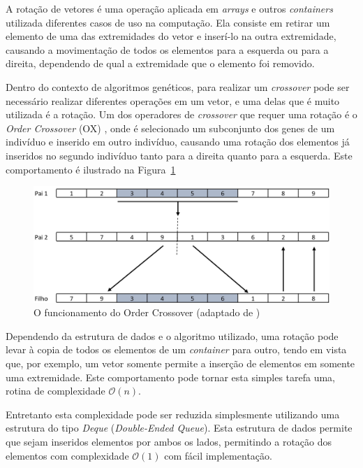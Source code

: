 \documentclass[12pt]{article}
\begin{document}
A rota\c{c}\~{a}o de vetores \'{e} uma opera\c{c}\~{a}o aplicada em \textit{arrays} e outros
\textit{containers} utilizada diferentes casos de uso na computa\c{c}\~{a}o.
Ela consiste em retirar um elemento de uma das extremidades do vetor e
inser\'{i}-lo na outra extremidade, causando a movimenta\c{c}\~{a}o de todos os elementos
para a esquerda ou para a direita, dependendo de qual a extremidade que o elemento
foi removido.

Dentro do contexto de algoritmos gen\'{e}ticos, para realizar um \textit{crossover} pode ser
necess\'{a}rio realizar diferentes opera\c{c}\~{o}es em um vetor, e uma delas que \'{e} muito
utilizada \'{e} a rota\c{c}\~{a}o. Um dos operadores de \textit{crossover} que requer uma
rota\c{c}\~{a}o \'{e} o \textit{Order Crossover} (OX) \cite{misc:geneticOperations}, onde \'{e} selecionado um subconjunto dos genes
de um indiv\'{i}duo e inserido em outro indiv\'{i}duo, causando uma rota\c{c}\~{a}o dos elementos j\'{a}
inseridos no segundo indiv\'{i}duo tanto para a direita quanto para a esquerda. Este comportamento \'{e}
ilustrado na Figura~\ref{fig:orderCrossover}

\begin{figure}[ht]
    \centering
    \includegraphics[width=.8\textwidth]{order_crossover.jpg}
    \caption{O funcionamento do Order Crossover (adaptado de \cite{misc:geneticOperations})}
    \label{fig:orderCrossover}
\end{figure}

Dependendo da estrutura de dados e o algoritmo utilizado, uma rota\c{c}\~{a}o pode levar \`{a}
copia de todos os elementos de um \textit{container} para outro, tendo em vista que, por exemplo,
um vetor somente permite a inser\c{c}\~{a}o de elementos em somente uma extremidade. Este
comportamento pode tornar esta simples tarefa uma, rotina de complexidade $\mathcal{O}(n)$.

Entretanto esta complexidade pode ser reduzida simplesmente utilizando uma estrutura do tipo
\textit{Deque} (\textit{Double-Ended Queue}). Esta estrutura de dados permite que sejam inseridos
elementos por ambos os lados, permitindo a rota\c{c}\~{a}o dos elementos com complexidade
$\mathcal{O}(1)$ com f\'{a}cil implementa\c{c}\~{a}o.
\end{document}
